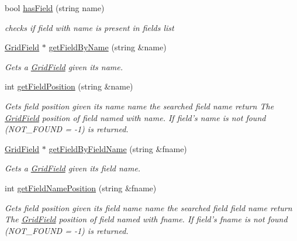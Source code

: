 \begin{DoxyCompactItemize}
bool \hyperlink{classfwi_1_1grid_1_1GridFields_ac34658d6ff8f0db162898b47b92c8bc2}{has\-Field} (string name)
\begin{DoxyCompactList}\small\item\em checks if field with name is present in fields list \end{DoxyCompactList}\item 
\hyperlink{classfwi_1_1grid_1_1GridField}{Grid\-Field} $\ast$ \hyperlink{classfwi_1_1grid_1_1GridFields_a5e442334885f0aad108694a8b2131c31}{get\-Field\-By\-Name} (string \&name)
\begin{DoxyCompactList}\small\item\em Gets a {\itshape \hyperlink{classfwi_1_1grid_1_1GridField}{Grid\-Field}} given its name. \end{DoxyCompactList}\item 
\hypertarget{classfwi_1_1grid_1_1GridFields_a3cdc87d29c6469e99499788ba004d957}{int \hyperlink{classfwi_1_1grid_1_1GridFields_a3cdc87d29c6469e99499788ba004d957}{get\-Field\-Position} (string \&name)}\label{classfwi_1_1grid_1_1GridFields_a3cdc87d29c6469e99499788ba004d957}

\begin{DoxyCompactList}\small\item\em Gets field {\itshape position} given its name  name the searched field name return The {\itshape \hyperlink{classfwi_1_1grid_1_1GridField}{Grid\-Field}} position of field named with {\itshape name}. If field's name is not found (N\-O\-T\-\_\-\-F\-O\-U\-N\-D = -\/1) is returned. \end{DoxyCompactList}\item 
\hyperlink{classfwi_1_1grid_1_1GridField}{Grid\-Field} $\ast$ \hyperlink{classfwi_1_1grid_1_1GridFields_a580e2c5ab477660d16237bb8d8030bd1}{get\-Field\-By\-Field\-Name} (string \&fname)
\begin{DoxyCompactList}\small\item\em Gets a {\itshape \hyperlink{classfwi_1_1grid_1_1GridField}{Grid\-Field}} given its field name. \end{DoxyCompactList}\item 
\hypertarget{classfwi_1_1grid_1_1GridFields_a7eba82f83dee48495d1057ba46c24dce}{int \hyperlink{classfwi_1_1grid_1_1GridFields_a7eba82f83dee48495d1057ba46c24dce}{get\-Field\-Name\-Position} (string \&fname)}\label{classfwi_1_1grid_1_1GridFields_a7eba82f83dee48495d1057ba46c24dce}

\begin{DoxyCompactList}\small\item\em Gets field {\itshape position} given its field name  name the searched field field name return The {\itshape \hyperlink{classfwi_1_1grid_1_1GridField}{Grid\-Field}} position of field named with {\itshape fname}. If field's fname is not found (N\-O\-T\-\_\-\-F\-O\-U\-N\-D = -\/1) is returned. \end{DoxyCompactList}\end{DoxyCompactItemize}


